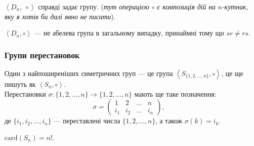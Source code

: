 \documentclass{math_library}
\begin{document}

\begin{theorem}
$\left< D_n,\ \circ \right>$ справді задає групу. (\textit{тут операцією $\circ$ є композиція дій на $n$-кутник, яку я хотів би далі явно не писати}).
\end{theorem}

\begin{remark}
$\left< D_n, \circ \right>$ --- не абелева група в загальному випадку, принаймні тому що $sr \neq rs$.
\end{remark}

\subsubsection{Групи перестановок}
Один з найпоширеніших симетричних груп --- це група $\left<S_{\{1,2,\dots,n\}}, \circ \right>$, це ще пишуть як $\left<S_n, \circ \right>$.\\
Перестановки $\sigma \colon \{1,2,\dots,n\} \to \{1,2,\dots,n\}$ мають ще таке позначення:
\[
 \sigma = \begin{pmatrix}
1 & 2 & \dots & n \\
i_1 & i_2 & \dots & i_n
\end{pmatrix},
\]
де $\{i_1,i_2,\dots,i_n\}$ --- переставлені числа $\{1,2,\dots,n\}$, а також $\sigma(k) = i_k$.

\begin{remark}
$\text{card}(S_n) = n!$.
\end{remark}
\end{document}
